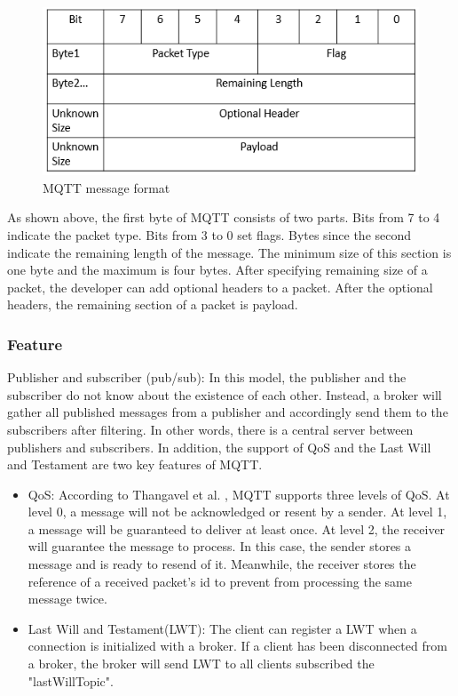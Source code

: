 \documentclass{Nan_Thesis}
\begin{document}
\begin{figure}[h]
  \centering 
      \includegraphics[scale=0.8]{pic/mqttformat.png} 
  \caption{MQTT message format\cite{banks2014mqtt}}
\end{figure}

As shown above, the first byte of MQTT consists of two parts. Bits from 7 to 4 indicate the packet type. Bits from 3 to 0 set flags. Bytes since the second indicate the remaining length of the message. The minimum size of this section is one byte and the maximum is four bytes. After specifying remaining size of a packet, the developer can add optional headers to a packet. After the optional headers, the remaining section of a packet is payload. 

\subsubsection{Feature}
Publisher and subscriber (pub/sub):  In this model, the publisher and the subscriber do not know about the existence of each other. Instead, a broker will gather all published messages from a publisher and accordingly send them to the subscribers after filtering. In other words, there is a central server between publishers and subscribers. In addition, the support of QoS and the Last Will and Testament are two key features of MQTT.
 
\begin{itemize}
  \item QoS: According to Thangavel et al. \cite{thangavel2014performance}, MQTT supports three levels of QoS. At level 0, a message will not be acknowledged or resent by a sender. At level 1, a message will be guaranteed to deliver at least once. At level 2, the receiver will guarantee the message to process. In this case, the sender stores a message and is ready to resend of it. Meanwhile, the receiver stores the reference of a received packet’s id to prevent from processing the same message twice.
  \item Last Will and Testament(LWT): The client can register a LWT when a connection is initialized with a broker. If a client has been disconnected from a broker, the broker will send LWT to all clients subscribed the "lastWillTopic". 
\end{itemize}
\end{document}
